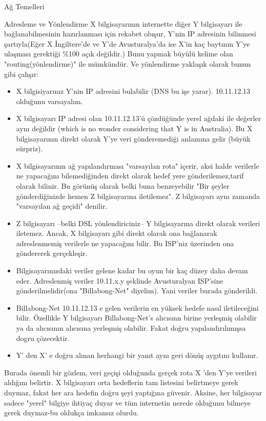 \begin{section}{Ağ Temelleri}
\begin{subsection}{Adresleme ve Yönlendirme}
X bilgisayarının internette diğer Y bilgisayarı ile bağlanabilmesinin hazırlanması için rekabet oluşur, Y'nin IP adresinin bilinmesi şartıyla(Eğer X İngiltere'de ve Y'de Avusturalya'da ise X'in kaç baytının Y'ye ulaşması gerektiği \%100 açık değildir.) Bunu yapmak büyülü kelime olan "routing(yönlendirme)" ile mümkündür. Ve yönlendirme yaklaşık olarak bunun gibi çalışır:
\begin{itemize}
\item X bilgisiyarınız Y'nin IP adresini bulabilir (DNS bu işe yarar). 10.11.12.13 olduğunu varsayalım.
\item X bilgisayarı IP adresi olan 10.11.12.13'ü çözdüğünde yerel ağdaki ile değerler aynı değildir (which is no wonder considering that Y is in
Australia). Bu X bilgisayarının direkt olarak Y'ye veri gönderemediği anlamına gelir (büyük sürpriz).
\item X bilgisayarının ağ yapılandırması "varsayılan rota" içerir, aksi halde verilerle ne yapacağını bilemediğinden direkt olarak hedef yere gönderilemez,tarif olarak bilinir. Bu görünüş olarak belki buna benzeyebilir "Bir şeyler gönderdiğinizde hemen Z bilgisayarına iletilemez". Z bilgisayarı aynı zamanda "varsayılan ağ geçidi" denilir.
\item Z bilgisayarı --belki DSL yönlendiriciniz-- Y bilgisayarına direkt olarak verileri iletemez. Ancak, X bilgisayarı gibi direkt olarak ona bağlanarak adreslenmemiş verilerle ne yapacağını bilir. Bu ISP'niz üzerinden ona göndererek gerçekleşir.
\item Bilgisayarınızdaki veriler gelene kadar bu oyun bir kaç düzey daha devam eder. Adreslenmiş veriler 10.11.x.y şeklinde  Avusturalyan ISP'sine gönderilmelidir(ona "Billabong-Net" diyelim). Yani veriler burada gönderildi.
\item Billabong-Net 10.11.12.13 e gelen verilerin en yüksek hedefe nasıl iletileceğini bilir. Özellikle Y bilgisayarı Billabong-Net's alıcısınn birine yerleşmiş olabilir ya da alıcısının alıcısına yerleşmiş olabilir. Fakat doğru yapılandırılımışsa dogru çözecektir.
\item Y' den X' e doğru alınan herhangi bir yanıt aynı geri dönüş aygıtını kullanır.
\end{itemize}

Burada önemli bir gözlem, veri geçişi olduğunda gerçek rota X 'den Y'ye verileri aldığını belirtir. X bilgisayarı orta hedeflerin tam listesini belirtmeye gerek duymaz, fakat her ara hedefin doğru şeyi yaptığına güvenir. Aksine, her bilgisayar sadece "yerel" bilgiye ihtiyaç duyar ve tüm internetin nerede olduğunu bilmeye gerek duymaz-bu oldukça imkansız olurdu.


\end{subsection}
\end{section}
